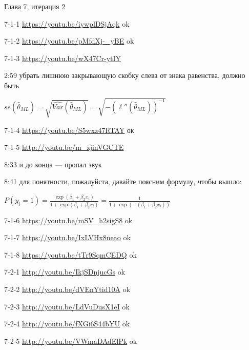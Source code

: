 \documentclass[12pt,a4paper]{article}
\begin{document}
Глава 7, итерация 2


7-1-1 \url{https://youtu.be/iywplDSjAqk} ok

7-1-2 \url{https://youtu.be/pMfdXj-_yBE} ok

7-1-3 \url{https://youtu.be/wX47Cr-ytIY}

2:59 убрать лишнюю закрывающую скобку слева от знака равенства, должно быть

$se(\hat{\theta}_{ML})=\sqrt{\widehat{Var}(\hat{\theta}_{ML})}=\sqrt{-(\ell ''(\hat{\theta}_{ML}))^{-1}}$

7-1-4 \url{https://youtu.be/S5wxz47RTAY} ок

7-1-5 \url{http://youtu.be/m_zjinVGCTE}

8:33 и до конца --- пропал звук

8:41 для понятности, пожалуйста, давайте поясним формулу, чтобы вышло:

$P(y_i=1)=\frac{\exp(\beta_1+\beta_2 x_i)}{1+\exp(\beta_1+\beta_2 x_i)}=\frac{1}{1+\exp(-(\beta_1+\beta_2 x_i))}$


7-1-6 \url{https://youtu.be/mSV_h2sigS8} ok

7-1-7 \url{https://youtu.be/IxLVHx8neao} ok

7-1-8 \url{https://youtu.be/tTr9SqmCEDQ} ok

7-2-1 \url{http://youtu.be/IkjSDnjucGs} ok

7-2-2 \url{http://youtu.be/dVEnYtid10A} ok

7-2-3 \url{http://youtu.be/LdVuDusX1eI} ok

7-2-4 \url{http://youtu.be/fXGi6S44bYU} ok

7-2-5 \url{http://youtu.be/VWmaDAdElPk} ok
\end{document}

